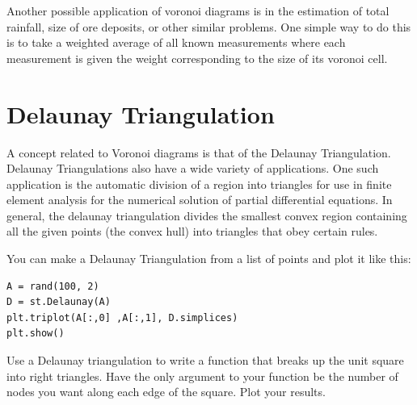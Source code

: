 Another possible application of voronoi diagrams is in the estimation of total rainfall, size of ore deposits, or other similar problems.
One simple way to do this is to take a weighted average of all known measurements where each measurement is given the weight corresponding to the size of its voronoi cell.

\section*{Delaunay Triangulation}

A concept related to Voronoi diagrams is that of the Delaunay Triangulation.
Delaunay Triangulations also have a wide variety of applications.
One such application is the automatic division of a region into triangles for use in finite element analysis for the numerical solution of partial differential equations.
In general, the delaunay triangulation divides the smallest convex region containing all the given points (the convex hull) into triangles that obey certain rules.

You can make a Delaunay Triangulation from a list of points and plot it like this:
\begin{lstlisting}
A = rand(100, 2)
D = st.Delaunay(A)
plt.triplot(A[:,0] ,A[:,1], D.simplices)
plt.show()
\end{lstlisting}

\begin{problem}
Use a Delaunay triangulation to write a function that breaks up the unit square into right triangles.
Have the only argument to your function be the number of nodes you want along each edge of the square.
Plot your results.
\end{problem}

